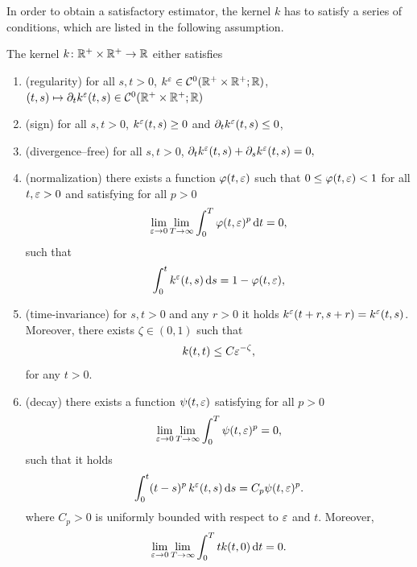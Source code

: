 \documentclass[10pt]{article}
\begin{document}
In order to obtain a satisfactory estimator, the kernel $k$ has to satisfy a series of conditions, which are listed in the following assumption.
\begin{assumption}\label{as:kern} The kernel $k \colon \mathbb{R}^+ \times \mathbb{R}^+ \to \mathbb{R}$ either satisfies
\begin{enumerate}[label=(\roman*)]
	\item \label{as:kernReg} (regularity) for all $s, t > 0$, $k^\varepsilon\in \mathcal C^0(\mathbb{R}^+\times\mathbb{R}^+; \mathbb{R})$, $(t,s) \mapsto \partial_t k^\varepsilon(t, s) \in \mathcal C^0(\mathbb{R}^+\times\mathbb{R}^+; \mathbb{R})$ 
	\item \label{as:kernPos} (sign) for all $s, t > 0$, $k^\varepsilon(t, s) \geq 0$ and $\partial_t k^\varepsilon(t, s) \leq 0$,
	\item \label{as:kernDivFree} (divergence--free) for all $s, t > 0$, $\partial_t k^\varepsilon(t, s) + \partial_s k^\varepsilon(t, s) = 0, $
	\item \label{as:kernNorm} (normalization) there exists a function $\varphi(t, \varepsilon)$ such that $0 \leq \varphi(t, \varepsilon) < 1$ for all $t, \varepsilon > 0$ and satisfying for all $p > 0$
	\begin{equation}
		\lim_{\varepsilon\to 0} \lim_{T\to\infty} \int_0^T \varphi(t, \varepsilon)^p \,\mathrm{d} t = 0,
	\end{equation}
	such that
	\begin{equation}
		\int_0^t k^\varepsilon(t, s) \,\mathrm{d} s = 1 - \varphi(t, \varepsilon),
	\end{equation}	
	\item \label{as:kernTimeInv} (time-invariance) for $s, t > 0$ and any $r > 0$ it holds $k^\varepsilon(t+r, s+r) = k^\varepsilon(t, s)$. Moreover, there exists $\zeta \in (0, 1)$ such that
	\begin{equation}
		k(t, t) \leq C \varepsilon^{-\zeta},
	\end{equation}
	for any $t > 0$.
	\item\label{as:kernVanish} (decay) there exists a function $\psi(t, \varepsilon)$ satisfying for all $p > 0$
	\begin{equation}
		 \lim_{\varepsilon\to 0} \lim_{T\to\infty} \int_0^T \psi(t, \varepsilon)^p = 0,
	\end{equation} 
	such that it holds 
	\begin{equation}
		\int_0^t (t-s)^p \, k^\varepsilon(t, s) \,\mathrm{d} s = C_p \psi(t, \varepsilon)^p.
	\end{equation}
	where $C_p > 0$ is uniformly bounded with respect to $\varepsilon$ and $t$. Moreover, 
	\begin{equation}
		\lim_{\varepsilon \to 0} \lim_{T\to\infty}\int_0^T t  k(t, 0) \,\mathrm{d} t = 0.
	\end{equation} 
\end{enumerate}	
\end{assumption}
\end{document}
